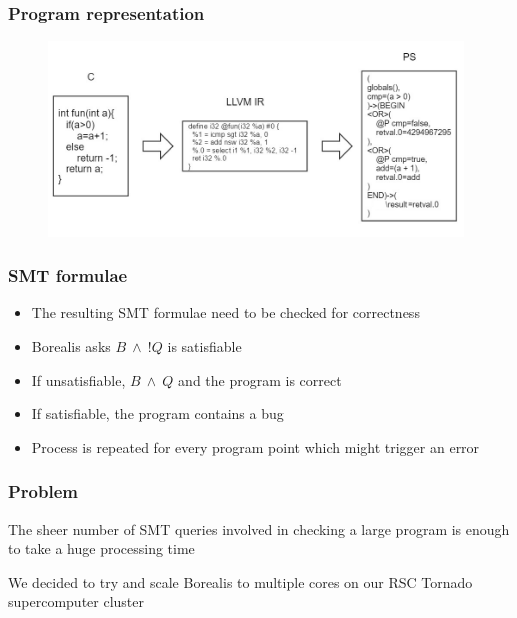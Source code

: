 \begin{frame}
	\frametitle{Program representation}
	\begin{figure}
	\includegraphics[width=110mm, keepaspectratio]{image/PSDef}
	\end{figure}
\end{frame}


\begin{frame}
	\frametitle{SMT formulae}
\begin{itemize}
	\item The resulting SMT formulae need to be checked for correctness
	\item Borealis asks $B \ \wedge \ !Q$ is satisfiable
	\item If unsatisfiable, $B \ \wedge \ Q$ and the program is correct
	\item If satisfiable, the program contains a bug
	\item Process is repeated for every program point which might trigger an error
\end{itemize}
\end{frame}


\begin{frame}
\frametitle{Problem}
\begin{block}{}
	\centering
	The sheer number of SMT queries involved in checking a large program is enough to take a huge processing time
\end{block}


\begin{block}{}
	\centering
	We decided to try and scale Borealis to multiple cores on our RSC Tornado supercomputer cluster
\end{block}
\end{frame}

